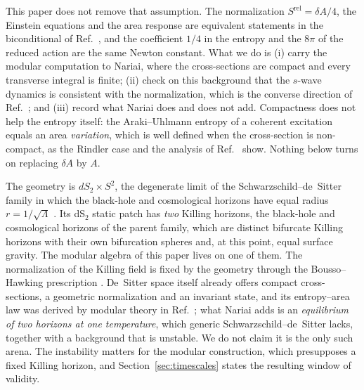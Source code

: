 \documentclass[11pt]{article}
\newcommand{\Srel}{S^{\mathrm{rel}}}
\begin{document}
This paper does not remove that assumption. The normalization $\Srel=\delta A/4$, the Einstein equations and the area response are equivalent statements in the biconditional of Ref.~\cite{DorauMuch}, and the coefficient $1/4$ in the entropy and the $8\pi$ of the reduced action are the same Newton constant. What we do is (i) carry the modular computation to Nariai, where the cross-sections are compact and every transverse integral is finite; (ii) check on this background that the $s$-wave dynamics is consistent with the normalization, which is the converse direction of Ref.~\cite{DorauMuch}; and (iii) record what Nariai does and does not add. Compactness does not help the entropy itself: the Araki--Uhlmann entropy of a coherent excitation equals an area \emph{variation}, which is well defined when the cross-section is non-compact, as the Rindler case and the analysis of Ref.~\cite{DAngelo} show. Nothing below turns on replacing $\delta A$ by $A$.

The geometry is $dS_2 \times S^2$, the degenerate limit of the Schwarzschild--de~Sitter family in which the black-hole and cosmological horizons have equal radius $r = 1/\sqrt{\Lambda}$ \cite{Nariai}. Its dS$_2$ static patch has \emph{two} Killing horizons, the black-hole and cosmological horizons of the parent family, which are distinct bifurcate Killing horizons with their own bifurcation spheres and, at this point, equal surface gravity. The modular algebra of this paper lives on one of them. The normalization of the Killing field is fixed by the geometry through the Bousso--Hawking prescription \cite{BoussoHawking}. De~Sitter space itself already offers compact cross-sections, a geometric normalization and an invariant state, and its entropy--area law was derived by modular theory in Ref.~\cite{DAngelo}; what Nariai adds is an \emph{equilibrium of two horizons at one temperature}, which generic Schwarzschild--de~Sitter lacks, together with a background that is unstable. We do not claim it is the only such arena. The instability matters for the modular construction, which presupposes a fixed Killing horizon, and Section~\ref{sec:timescales} states the resulting window of validity.
\end{document}
